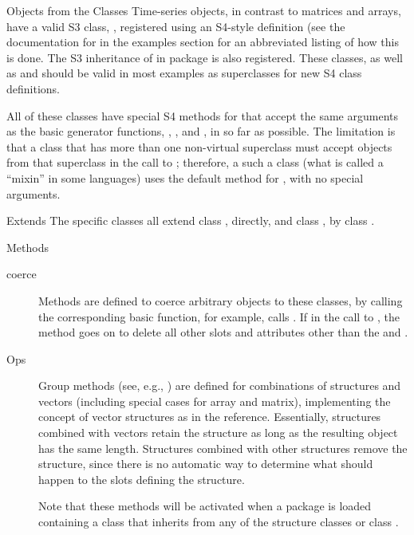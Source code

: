 \begin{Section}{Objects from the Classes}
Time-series objects, in contrast to matrices and arrays, have a valid
S3 class, , registered  using an S4-style definition (see the
documentation for  in the examples section
for an abbreviated listing of how this is done.  The S3
inheritance of  in package  is also
registered.
These classes, as well as  and  should
be valid in most examples as superclasses for new S4 class
definitions.

All of these classes have special S4 methods for
 that accept the same arguments as the basic
generator functions, ,
, and , in so far as possible.
The limitation is that a class that has more than one non-virtual
superclass must accept objects from that superclass in the call to
; therefore, a such a class (what is called a
``mixin'' in some languages) uses the default method for
, with no special arguments.

\end{Section}
%
\begin{Section}{Extends}
The specific classes all extend class , directly, and
class , by class .
\end{Section}
%
\begin{Section}{Methods}
\begin{description}

\item[coerce] Methods are defined to coerce arbitrary objects to
these classes, by calling the corresponding basic function, for
example,  calls .
If  in the call to , the method
goes on to delete all other slots and attributes other than the
 and .

\item[Ops] Group methods (see, e.g., )
are defined for combinations of structures and vectors (including
special cases for array and matrix), implementing the concept of
vector structures as in the reference.  Essentially, structures
combined with vectors retain the structure as long as the
resulting object has the same length.  Structures combined with
other structures remove the structure, since there is no
automatic way to determine what should happen to the slots
defining the structure.

Note that these methods will be activated when a package is loaded
containing a class that inherits from any of the structure
classes or class .


\end{description}

\end{Section}
